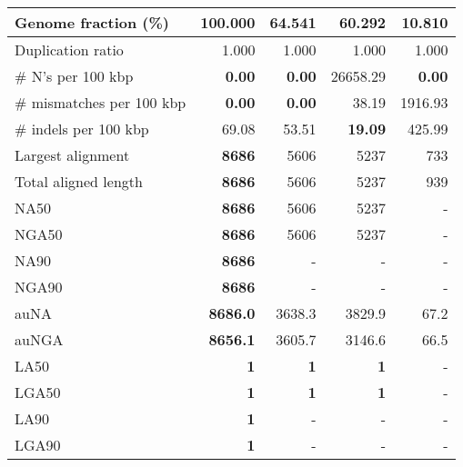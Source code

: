 \documentclass[12pt,a4paper]{article}
\begin{document}
\begin{table}[ht]
\begin{center}
\begin{tabular}{|l*{4}{|r}|}
Genome fraction (\%) & {\bf 100.000} & 64.541 & 60.292 & 10.810 \\ \hline
Duplication ratio & 1.000 & 1.000 & 1.000 & 1.000 \\ \hline
\# N's per 100 kbp & {\bf 0.00} & {\bf 0.00} & 26658.29 & {\bf 0.00} \\ \hline
\# mismatches per 100 kbp & {\bf 0.00} & {\bf 0.00} & 38.19 & 1916.93 \\ \hline
\# indels per 100 kbp & 69.08 & 53.51 & {\bf 19.09} & 425.99 \\ \hline
Largest alignment & {\bf 8686} & 5606 & 5237 & 733 \\ \hline
Total aligned length & {\bf 8686} & 5606 & 5237 & 939 \\ \hline
NA50 & {\bf 8686} & 5606 & 5237 & - \\ \hline
NGA50 & {\bf 8686} & 5606 & 5237 & - \\ \hline
NA90 & {\bf 8686} & - & - & - \\ \hline
NGA90 & {\bf 8686} & - & - & - \\ \hline
auNA & {\bf 8686.0} & 3638.3 & 3829.9 & 67.2 \\ \hline
auNGA & {\bf 8656.1} & 3605.7 & 3146.6 & 66.5 \\ \hline
LA50 & {\bf 1} & {\bf 1} & {\bf 1} & - \\ \hline
LGA50 & {\bf 1} & {\bf 1} & {\bf 1} & - \\ \hline
LA90 & {\bf 1} & - & - & - \\ \hline
LGA90 & {\bf 1} & - & - & - \\ \hline
\end{tabular}
\end{center}
\end{table}
\end{document}
